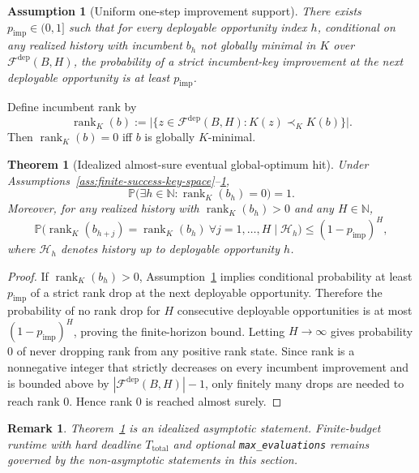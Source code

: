 \documentclass[11pt]{article}
\newtheorem{theorem}{Theorem}
\newtheorem{remark}{Remark}
\newtheorem{assumption}{Assumption}
\begin{document}
\begin{assumption}[Uniform one-step improvement support]\label{ass:uniform-improvement-support}
There exists $p_{\mathrm{imp}}\in(0,1]$ such that for every deployable opportunity
index $h$, conditional on any realized history with incumbent $b_h$ not globally
minimal in $K$ over $\mathcal{F}^{\mathrm{dep}}(B,H)$, the probability of a strict
incumbent-key improvement at the next deployable opportunity is at least
$p_{\mathrm{imp}}$.
\end{assumption}

Define incumbent rank by
\[
\operatorname{rank}_K(b):=
\big|\{z\in\mathcal{F}^{\mathrm{dep}}(B,H):K(z)\prec_K K(b)\}\big|.
\]
Then $\operatorname{rank}_K(b)=0$ iff $b$ is globally $K$-minimal.

\begin{theorem}[Idealized almost-sure eventual global-optimum hit]\label{thm:idealized-asymptotic-hit}
Under Assumptions~\ref{ass:finite-success-key-space}--\ref{ass:uniform-improvement-support},
\[
\mathbb{P}\!\big(\exists h\in\mathbb{N}:\operatorname{rank}_K(b_h)=0\big)=1.
\]
Moreover, for any realized history with $\operatorname{rank}_K(b_h)>0$ and any
$H\in\mathbb{N}$,
\[
\mathbb{P}\!\big(\operatorname{rank}_K(b_{h+j})=\operatorname{rank}_K(b_h)\ \forall j=1,\dots,H\mid\mathcal{H}_h\big)
\le (1-p_{\mathrm{imp}})^H,
\]
where $\mathcal{H}_h$ denotes history up to deployable opportunity $h$.
\end{theorem}

\begin{proof}
If $\operatorname{rank}_K(b_h)>0$, Assumption~\ref{ass:uniform-improvement-support}
implies conditional probability at least $p_{\mathrm{imp}}$ of a strict rank
drop at the next deployable opportunity. Therefore the probability of no rank
drop for $H$ consecutive deployable opportunities is at most
$(1-p_{\mathrm{imp}})^H$, proving the finite-horizon bound. Letting
$H\to\infty$ gives probability $0$ of never dropping rank from any positive
rank state. Since rank is a nonnegative integer that strictly decreases on
every incumbent improvement and is bounded above by
$|\mathcal{F}^{\mathrm{dep}}(B,H)|-1$, only finitely many drops are needed to
reach rank $0$. Hence rank $0$ is reached almost surely.
\end{proof}

\begin{remark}
Theorem~\ref{thm:idealized-asymptotic-hit} is an idealized asymptotic statement.
Finite-budget runtime with hard deadline $T_{\mathrm{total}}$ and optional
\texttt{max\_evaluations} remains governed by the non-asymptotic statements in
this section.
\end{remark}
\end{document}

